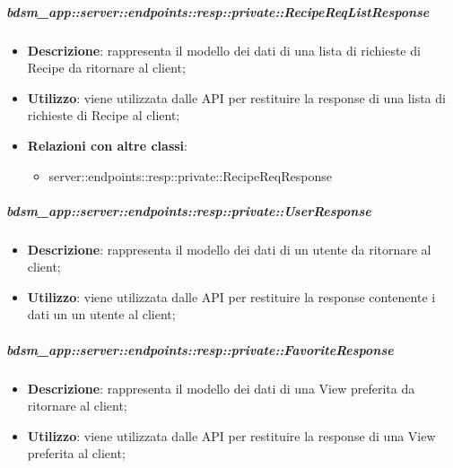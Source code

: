     \subparagraph{bdsm\_app::server::endpoints::resp::private::RecipeReqListResponse} %
    \label{subp:bdsm_app_server_endpoints_resp_private_recipereqlistresponse}
    \begin{itemize}
      \item \textbf{Descrizione}: rappresenta il modello dei dati di una lista di richieste di Recipe da ritornare al client;
      \item \textbf{Utilizzo}: viene utilizzata dalle API per restituire la response di una lista di richieste di Recipe al client;
      \item \textbf{Relazioni con altre classi}:
        \begin{itemize}
          \item server::endpoints::resp::private::RecipeReqResponse
        \end{itemize}
      \end{itemize}

    \subparagraph{bdsm\_app::server::endpoints::resp::private::UserResponse} %
    \label{subp:bdsm_app_server_endpoints_resp_private_userresponse}
    \begin{itemize}
      \item \textbf{Descrizione}: rappresenta il modello dei dati di un utente da ritornare al client;
      \item \textbf{Utilizzo}: viene utilizzata dalle API per restituire la response contenente i dati un un utente al client;
    \end{itemize}

    \subparagraph{bdsm\_app::server::endpoints::resp::private::FavoriteResponse} %
    \label{subp:bdsm_app_server_endpoints_resp_private_favoriteresponse}
    \begin{itemize}
      \item \textbf{Descrizione}: rappresenta il modello dei dati di una View preferita da ritornare al client;
      \item \textbf{Utilizzo}: viene utilizzata dalle API per restituire la response di una View preferita al client;
    \end{itemize}

